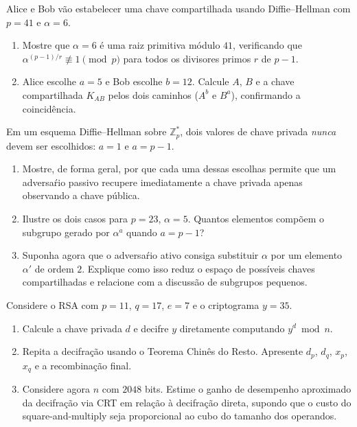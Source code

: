 \documentclass[12pt,a4paper]{article}
\begin{document}
\begin{exercicio}
Alice e Bob v\~{a}o estabelecer uma chave compartilhada usando Diffie--Hellman com $p = 41$ e $\alpha = 6$.
\begin{enumerate}[label=(\alph*)]
    \item Mostre que $\alpha = 6$ \'{e} uma raiz primitiva m\'{o}dulo $41$, verificando que $\alpha^{(p-1)/r} \not\equiv 1 \pmod{p}$ para todos os divisores primos $r$ de $p-1$.
    \item Alice escolhe $a = 5$ e Bob escolhe $b = 12$. Calcule $A$, $B$ e a chave compartilhada $K_{AB}$ pelos dois caminhos ($A^{b}$ e $B^{a}$), confirmando a coincid\^{e}ncia.
\end{enumerate}
\end{exercicio}

\begin{exercicio}
Em um esquema Diffie--Hellman sobre $\mathbb{Z}_{p}^{*}$, dois valores de chave privada \emph{nunca} devem ser escolhidos: $a = 1$ e $a = p-1$.
\begin{enumerate}[label=(\alph*)]
    \item Mostre, de forma geral, por que cada uma dessas escolhas permite que um adversa\'{r}io passivo recupere imediatamente a chave privada apenas observando a chave p\'{u}blica.
    \item Ilustre os dois casos para $p = 23$, $\alpha = 5$. Quantos elementos comp\~{o}em o subgrupo gerado por $\alpha^{a}$ quando $a = p-1$?
    \item Suponha agora que o adversa\'{r}io ativo consiga substituir $\alpha$ por um elemento $\alpha'$ de ordem $2$. Explique como isso reduz o espa\c{c}o de poss\'{i}veis chaves compartilhadas e relacione com a discuss\~{a}o de subgrupos pequenos.
\end{enumerate}
\end{exercicio}

\begin{exercicio}
Considere o RSA com $p = 11$, $q = 17$, $e = 7$ e o criptograma $y = 35$.
\begin{enumerate}[label=(\alph*)]
    \item Calcule a chave privada $d$ e decifre $y$ diretamente computando $y^{d} \bmod n$.
    \item Repita a decifra\c{c}\~{a}o usando o Teorema Chin\^{e}s do Resto. Apresente $d_p$, $d_q$, $x_p$, $x_q$ e a recombina\c{c}\~{a}o final.
    \item Considere agora $n$ com $2048$ bits. Estime o ganho de desempenho aproximado da decifra\c{c}\~{a}o via CRT em rela\c{c}\~{a}o \`{a} decifra\c{c}\~{a}o direta, supondo que o custo do square-and-multiply seja proporcional ao cubo do tamanho dos operandos.
\end{enumerate}
\end{exercicio}
\end{document}
